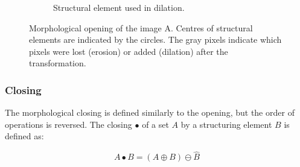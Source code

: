 \documentclass[
  digital,     %
  oneside,     %
  nosansbold,  %
  nocolorbold, %
  lof,         %
  lot,         %
]{fithesis4}
\begin{document}
\begin{figure}
\begin{subfigure}[t]{0.2\textwidth}
        \caption{Structural element used in dilation.}
        \label{fig:closing_dilation_se}
    \end{subfigure}
    \caption{Morphological opening of the image A. Centres of structural
    elements are indicated by the circles. The gray pixels indicate which pixels
    were lost (erosion) or added (dilation) after the transformation.}
    \label{fig:opening}
\end{figure}

\subsubsection{Closing}

The morphological closing is defined similarly to the opening, but the order of
operations is reversed. The closing $\bullet$ of a set $A$ by a structuring
element $B$ is defined as\cite{soile2004}:

$$A \bullet B = (A \oplus B) \ominus \hat{B} $$
\end{document}
